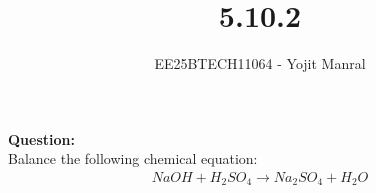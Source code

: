 \documentclass[journal]{IEEEtran}
\begin{document}

\vspace{3cm}

\title{5.10.2}
\author{EE25BTECH11064 - Yojit Manral}

\maketitle
{\let\newpage\relax\maketitle}
\renewcommand{\thefigure}{\theenumi}
\renewcommand{\thetable}{\theenumi}
\setlength{\intextsep}{10pt} %

\textbf{Question:}\\
Balance the following chemical equation:
\begin{align}
    NaOH + H_2SO_4 \rightarrow Na_2SO_4 + H_2O
\end{align}
\end{document}
